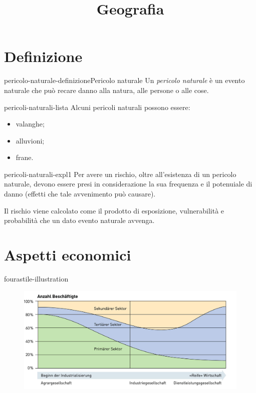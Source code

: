 \documentclass[preview]{standalone}
\begin{document}
\title{Geografia}
\genpage

\section{Definizione}

\begin{snippetdefinition}{pericolo-naturale-definizione}{Pericolo naturale}
    Un \textit{pericolo naturale} è un evento naturale che può recare danno alla
    natura, alle persone o alle cose.
\end{snippetdefinition}

\begin{snippet}{pericoli-naturali-lista}
    Alcuni pericoli naturali possono essere:
    \begin{itemize}
        \item valanghe;
        \item alluvioni;
        \item frane.
    \end{itemize}
\end{snippet}

\begin{snippet}{pericoli-naturali-expl1}
    Per avere un rischio, oltre all'esistenza di un pericolo naturale, devono essere presi
    in considerazione la sua frequenza e il potenuiale di danno (effetti che tale
    avvenimento può causare).

    Il rischio viene calcolato come il prodotto di
    esposizione, vulnerabilità e probabilità che un dato evento naturale avvenga.
\end{snippet}

\section{Aspetti economici}


\begin{snippet}{fourastile-illustration}
    \begin{center}
    \begin{figure}[th]
        \centering
        \includegraphics[width=\textwidth]{./resources/fourastie.png}
    \end{figure}
    \end{center}
\end{snippet}
\end{document}
